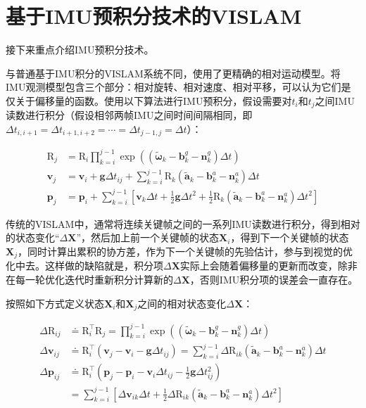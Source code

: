 \section{基于IMU预积分技术的VISLAM}

接下来重点介绍IMU预积分技术\citep{forster2017manifold}。

与普通基于IMU积分的VISLAM系统不同，\citep{forster2017manifold}使用了更精确的相对运动模型。将IMU观测模型包含三个部分：相对旋转、相对速度、相对平移，可以认为它们是仅关于偏移量的函数。使用以下算法进行IMU预积分，假设需要对$t_i$和$t_j$之间IMU读数进行积分（假设相邻两帧IMU之间时间间隔相同，即$\Delta t_{i,i+1} = \Delta t_{i+1,i+2} = \cdots = \Delta t_{j-1,j} = \Delta t$）：

\begin{equation}
\begin{aligned}
\mathrm{R}_j &= \mathrm{R}_i \prod_{k=i}^{j-1}
                \exp\left(
                    (\tilde{\bm\omega}_k - \bm{b}_k^g - \bm{n}_k^g) \Delta t
                \right) \\
\bm{v}_j &= \bm{v}_i + \bm{g} \Delta t_{ij} + \sum_{k=i}^{j-1}
\mathrm{R}_k (\tilde{\bm{a}}_k - \bm{b}_k^a - \bm{n}_k^a) \Delta t \\
\bm{p}_j &= \bm{p}_i + \sum_{k=i}^{j-1}
                \left[
                    \bm{v}_k \Delta t +
                    \frac{1}{2}\bm{g}\Delta t^2 +
                    \frac{1}{2}\mathrm{R}_k
                    (\tilde{\bm a}_k - \bm{b}_k^a - \bm{n}_k^a) \Delta t^2
                \right]
    \end{aligned}
\end{equation}

传统的VISLAM中，通常将连续关键帧之间的一系列IMU读数进行积分，得到相对的状态变化“$\Delta\bm X$”，然后加上前一个关键帧的状态$\bm{X}_i$，得到下一个关键帧的状态$\bm{X}_j$，同时计算出累积的协方差，作为下一个关键帧的先验估计，参与到视觉的优化中去。这样做的缺陷就是，积分项$\Delta\bm X$实际上会随着偏移量的更新而改变，除非在每一轮优化迭代时重新积分计算新的$\Delta\bm X$，否则IMU积分项的误差会一直存在。

按照如下方式定义状态$\bm{X}_i$和$\bm{X}_j$之间的相对状态变化$\Delta\bm X$：

\begin{equation}
\begin{aligned}
    \Delta\mathrm{R}_{ij}
  &\doteq \mathrm{R}_i^\top \mathrm{R}_j
  = \prod_{k=i}^{j-1}
  \exp\left(
      (\tilde{\bm \omega}_k - \bm{b}_k^g - \bm{n}_k^g) \Delta t
  \right) \\
  \Delta\bm{v}_{ij}
  &\doteq \mathrm{R}_i^\top (\bm{v}_j - \bm{v}_i - \bm{g} \Delta t_{ij})
  = \sum_{k=i}^{j-1}
  \Delta\mathrm{R}_{ik}
  (\tilde{\bm a}_k - \bm{b}_k^a - \bm{n}_k^a) \Delta t \\
  \Delta\bm{p}_{ij}
  &\doteq \mathrm{R}_i^\top
  \left(
      \bm{p}_j - \bm{p}_i -
      \bm{v}_i \Delta t_{ij} -
      \frac{1}{2} \bm{g} \Delta t_{ij}^2
  \right) \\
  &=           \sum_{k=i}^{j-1}
  \left[
      \Delta\bm{v}_{ik} \Delta t +
      \frac{1}{2} \Delta\mathrm{R}_{ik}
      (\tilde{\bm a}_k - \bm{b}_k^a - \bm{n}_k^a) \Delta t^2
  \right]
\end{aligned}\label{eq:raw_int}
\end{equation}

